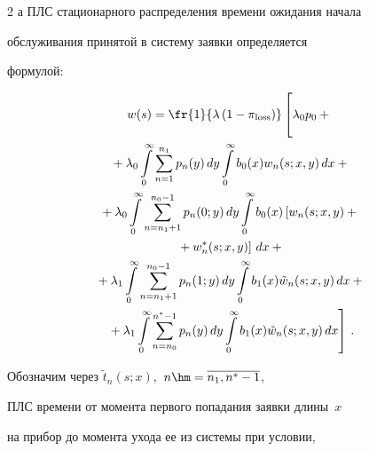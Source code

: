 \begin{multicols}{2}
а ПЛС стационарного распределения времени ожидания начала


обслуживания принятой в систему заявки определяется


формулой:


\begin{multline*}




w(s) = \fr{1}{\lambda \left( 


1-\pi_{\mathrm{loss}}\right)}


\left[ \vphantom{\int\limits_0^\infty}


\lambda_0 p_0 + {}\right.\\


{}+\lambda_0 \int\limits_0^\infty \sum\limits_{n=1}^{n_1}


p_n(y) \, dy \int\limits_0^\infty b_0(x) w_n(s;x,y) \, dx +{}


\\


{}+


\lambda_0 \int\limits_0^\infty \sum\limits_{n=n_1+1}^{n_0-1} p_n(0;y) \, dy


\int\limits_0^\infty b_0(x) \left[w_n(s;x,y) +{}\right.\\


\left.{}+ w^*_n(s;x,y)


\right]


\, dx +{}\\


{}+ \lambda_1 \int\limits_0^\infty \sum\limits_{n=n_1+1}^{n_0-1}


p_n(1;y) \, dy \int\limits_0^\infty b_1(x) \tilde{w}_n(s;x,y) \, dx +{}\\


\left.{}+


\lambda_1 \int\limits_0^\infty \sum\limits_{n=n_0}^{n^*-1} p_n(y) \, dy


\int\limits_0^\infty b_1(x) \tilde{w}_n(s;x,y) \, dx\right]\,.


\end{multline*}








Обозначим через $\tilde{t}_n(s;x)$,\  $n\hm=\overline{n_1,n^*-1}$,


ПЛС времени от момента первого попадания заявки длины~$x$


на прибор до момента ухода ее из системы при условии,



\end{multicols}
